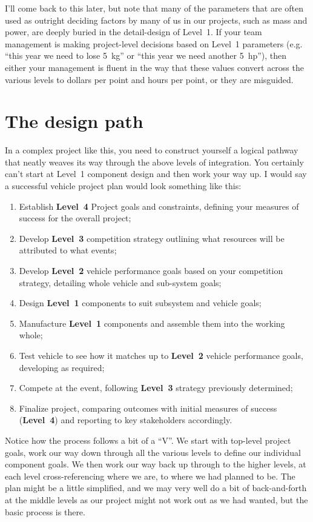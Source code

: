 \documentclass[10pt, a4paper, article, oneside, twocolumn, final]{memoir}
\begin{document}
I’ll come back to this later, but note that many of the parameters that are often used as outright deciding factors by many of us in our projects, such as mass and power, are deeply buried in the detail-design of Level~1. If your team management is making project-level decisions based on Level~1 parameters (e.g. “this year we need to lose \SI{5}{\kilogram}” or “this year we need another \SI{5}{hp}”), then either your management is fluent in the way that these values convert across the various levels to dollars per point and hours per point, or they are misguided.

\section*{The design path}

In a complex project like this, you need to construct yourself a logical pathway that neatly weaves its way through the above levels of integration. You certainly can’t start at Level~1 component design and then work your way up. I would say a successful vehicle project plan would look something like this: 

\begin{enumerate}
    \item Establish \textbf{Level~4} Project goals and constraints, defining your measures of success for the overall project;
    \item Develop \textbf{Level~3} competition strategy outlining what resources will be attributed to what events;
    \item Develop \textbf{Level~2} vehicle performance goals based on your competition strategy, detailing whole vehicle and sub-system goals;
    \item Design \textbf{Level~1} components to suit subsystem and vehicle goals;
    \item Manufacture \textbf{Level~1} components and assemble them into the working whole;
    \item Test vehicle to see how it matches up to \textbf{Level~2} vehicle performance goals, developing as required;
    \item Compete at the event, following \textbf{Level~3} strategy previously determined;
    \item Finalize project, comparing outcomes with initial measures of success (\textbf{Level~4}) and reporting to key stakeholders accordingly.
\end{enumerate}

Notice how the process follows a bit of a “V”. We start with top-level project goals, work our way down through all the various levels to define our individual component goals. We then work our way back up through to the higher levels, at each level cross-referencing where we are, to where we had planned to be. The plan might be a little simplified, and we may very well do a bit of back-and-forth at the middle levels as our project might not work out as we had wanted, but the basic process is there. 
\end{document}
